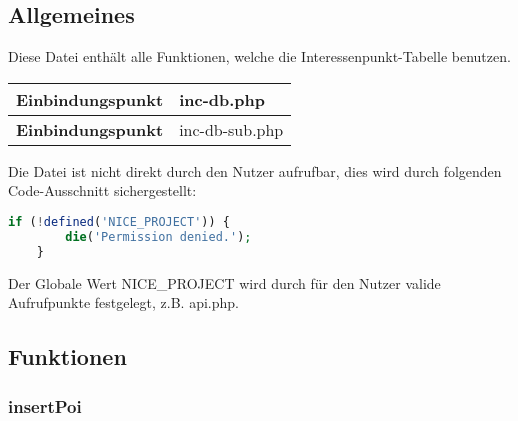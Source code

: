 \subsection{Allgemeines} Diese Datei enthält alle Funktionen, welche die Interessenpunkt-Tabelle benutzen.
\begin{table}[H]
	\begin{tabular}{|c|p{11cm}|}
		\hline
		\textbf{Einbindungspunkt} & inc-db.php \\ \hline
		\textbf{Einbindungspunkt} & inc-db-sub.php \\ \hline
	\end{tabular}
\end{table}
Die Datei ist nicht direkt durch den Nutzer aufrufbar, dies wird durch folgenden Code-Ausschnitt sichergestellt:
\begin{lstlisting}[language=php]
	if (!defined('NICE_PROJECT')) {
		die('Permission denied.');
	}
\end{lstlisting}
Der Globale Wert {\glqq NICE\_PROJECT\grqq} wird durch für den Nutzer valide Aufrufpunkte festgelegt, z.B. {\glqq api.php\grqq}.
\newpage
\subsection{Funktionen}
\subsubsection{insertPoi}
